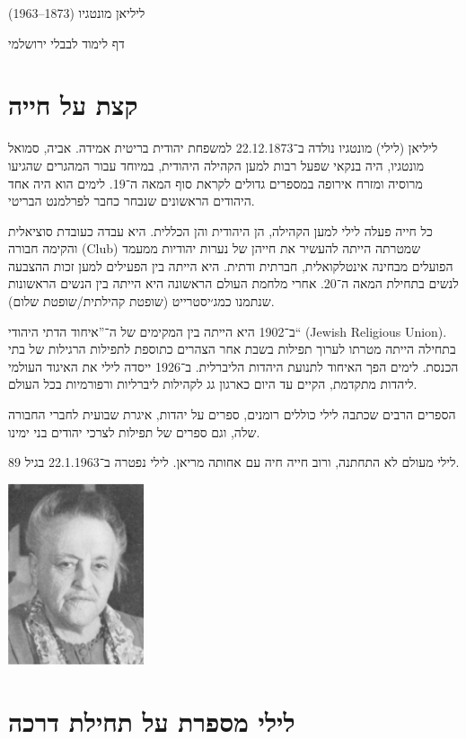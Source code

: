 \documentclass[14pt, article, extrafontsizes, twopage, a4paper]{memoir}
\begin{document}
{
  \centering
  \LARGE ליליאן מונטגיו (1873–1963)

  \Large דף לימוד לבבלי ירושלמי

}

\chapter{קצת על חייה}

ליליאן (לילי) מונטגיו נולדה ב־22.12.1873 למשפחת יהודית בריטית אמידה. אביה, סמואל מונטגיו, היה בנקאי שפעל רבות למען הקהילה היהודית, במיוחד עבור המהגרים שהגיעו מרוסיה ומזרח אירופה במספרים גדולים לקראת סוף המאה ה־19. לימים הוא היה אחד היהודים הראשונים שנבחר כחבר לפרלמנט הבריטי.

כל חייה פעלה לילי למען הקהילה, הן היהודית והן הכללית. היא עבדה כעובדת סוציאלית והקימה חבורה (\textenglish{Club}) שמטרתה הייתה להעשיר את חייהן של נערות יהודיות ממעמד הפועלים מבחינה אינטלקואלית, חברתית ודתית. היא הייתה בין הפעילים למען זכות ההצבעה לנשים בתחילת המאה ה־20. אחרי מלחמת העולם הראשונה היא הייתה בין הנשים הראשונות שנתמנו כמג׳יסטרייט (שופטת קהילתית/שופטת שלום).

ב־1902 היא הייתה בין המקימים של ה־”איחוד הדתי היהודי“ (\textenglish{Jewish Religious Union}). בתחילה הייתה מטרתו לערוך תפילות בשבת אחר הצהרים כתוספת לתפילות הרגילות של בתי הכנסת. לימים הפך האיחוד לתנועת היהדות הליברלית. ב־1926 ייסדה לילי את האיגוד העולמי ליהדות מתקדמת, הקיים עד היום כארגון גג לקהילות ליברליות ורפורמיות בכל העולם.

הספרים הרבים שכתבה לילי כוללים רומנים, ספרים על יהדות, איגרת שבועית לחברי החבורה שלה, וגם ספרים של תפילות לצרכי יהודים בני ימינו.

לילי מעולם לא התחתנה, ורוב חייה חיה עם אחותה מריאן. לילי נפטרה ב־22.1.1963 בגיל 89.

{
  \centering
\includegraphics[width=4cm]{lilyolder.png}\\

}


\chapter{לילי מספרת על תחילת דרכה}
\end{document}
